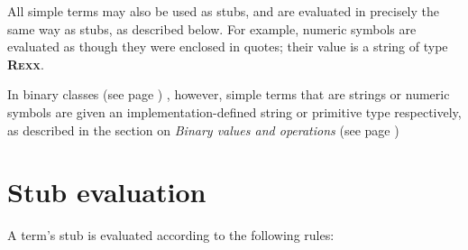 All simple terms may also be used as stubs, and are evaluated in
precisely the same way as stubs, as described below.  For example,
numeric symbols are evaluated as though they were enclosed in quotes;
their value is a string of type \textbf{R\textsc{exx}}.
 
In  binary classes (see page \pageref{refbincla}) , however, simple terms that are
strings or numeric symbols are given an implementation-defined string or
primitive type respectively, as described in the section on
 \emph{Binary values and operations} (see page \pageref{refbinary}) 
\section{Stub evaluation}
 
A term's stub is evaluated according to the following rules:
